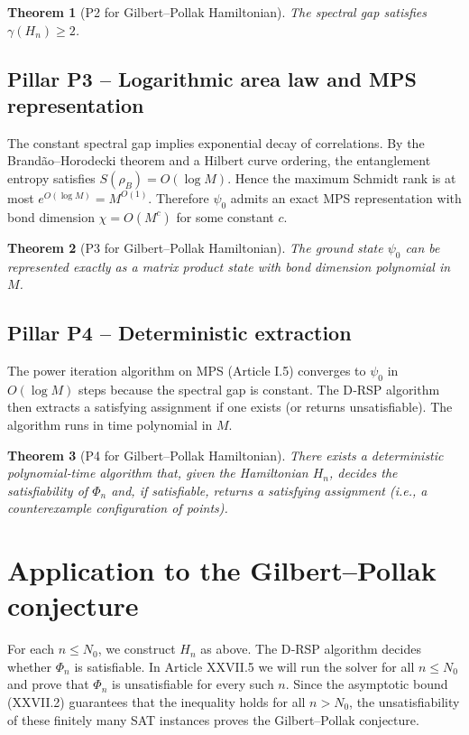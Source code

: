 \documentclass[11pt,a4paper]{article}
\newtheorem{theorem}{Theorem}[section]
\begin{document}
\begin{theorem}[P2 for Gilbert–Pollak Hamiltonian]
The spectral gap satisfies \(\gamma(H_n) \ge 2\).
\end{theorem}

\subsection{Pillar P3 – Logarithmic area law and MPS representation}
The constant spectral gap implies exponential decay of correlations. By the Brandão–Horodecki theorem and a Hilbert curve ordering, the entanglement entropy satisfies \(S(\rho_B) = O(\log M)\). Hence the maximum Schmidt rank is at most \(e^{O(\log M)} = M^{O(1)}\). Therefore \(\psi_0\) admits an exact MPS representation with bond dimension \(\chi = O(M^c)\) for some constant \(c\).

\begin{theorem}[P3 for Gilbert–Pollak Hamiltonian]
The ground state \(\psi_0\) can be represented exactly as a matrix product state with bond dimension polynomial in \(M\).
\end{theorem}

\subsection{Pillar P4 – Deterministic extraction}
The power iteration algorithm on MPS (Article I.5) converges to \(\psi_0\) in \(O(\log M)\) steps because the spectral gap is constant. The D‑RSP algorithm then extracts a satisfying assignment if one exists (or returns unsatisfiable). The algorithm runs in time polynomial in \(M\).

\begin{theorem}[P4 for Gilbert–Pollak Hamiltonian]
There exists a deterministic polynomial‑time algorithm that, given the Hamiltonian \(H_n\), decides the satisfiability of \(\Phi_n\) and, if satisfiable, returns a satisfying assignment (i.e., a counterexample configuration of points).
\end{theorem}

\section{Application to the Gilbert–Pollak conjecture}
For each \(n \le N_0\), we construct \(H_n\) as above. The D‑RSP algorithm decides whether \(\Phi_n\) is satisfiable. In Article XXVII.5 we will run the solver for all \(n \le N_0\) and prove that \(\Phi_n\) is unsatisfiable for every such \(n\). Since the asymptotic bound (XXVII.2) guarantees that the inequality holds for all \(n > N_0\), the unsatisfiability of these finitely many SAT instances proves the Gilbert–Pollak conjecture.
\end{document}
